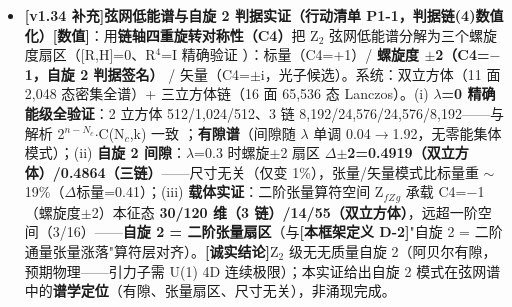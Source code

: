 \documentclass[12pt]{article}
\newcommand{\mtag}[1]{\textbf{[#1]}}
\newcommand{\up}[1]{\ensuremath{^{#1}}}
\newcommand{\down}[1]{\ensuremath{_{#1}}}
\begin{document}
\begin{itemize}
\item \textbf{\mtag{v1.34 补充}弦网低能谱与自旋 2 判据实证（行动清单 P1-1，判据链(4)数值化）}\mtag{数值}：用\textbf{链轴四重旋转对称性（C4）}把 Z\down{2} 弦网低能谱分解为三个螺旋度扇区（[R,H]=0、R\up{4}=I 精确验证 \checkmark）：标量（C4=+1）/ \textbf{螺旋度 \ensuremath{\pm}2（C4=\ensuremath{-}1，自旋 2 判据签名）} / 矢量（C4=\ensuremath{\pm}i，光子候选）。系统：双立方体（11 面 2,048 态密集全谱）+ 三立方体链（16 面 65,536 态 Lanczos）。(i) \textbf{\ensuremath{\lambda}=0 精确能级全验证}：2 立方体 512/1,024/512、3 链 8,192/24,576/24,576/8,192------与解析 2\up{n-N\down{c}}\ensuremath{\cdot}C(N\down{c},k) 一致 \checkmark；\textbf{有隙谱}（间隙随 \ensuremath{\lambda} 单调 0.04\ensuremath{\to}1.92，无零能集体模式）；(ii) \textbf{自旋 2 间隙}：\ensuremath{\lambda}=0.3 时螺旋\ensuremath{\pm}2 扇区 \textbf{\ensuremath{\Delta}\ensuremath{\pm}2=0.4919（双立方体）/0.4864（三链）}------尺寸无关（仅变 1\%），张量/矢量模式比标量重 \ensuremath{\sim}19\%（\ensuremath{\Delta}标量=0.41）；(iii) \textbf{载体实证}：二阶张量算符空间 Z\down{fZ}\down{g} 承载 C4=\ensuremath{-}1（螺旋度\ensuremath{\pm}2）本征态 \textbf{30/120 维（3 链）/14/55（双立方体）}，远超一阶空间（3/16）------\textbf{自旋 2 = 二阶张量扇区}（与\mtag{本框架定义 D-2}"自旋 2 = 二阶通量张量涨落"算符层对齐）。\mtag{诚实结论}Z\down{2} 级无无质量自旋 2（阿贝尔有隙，预期物理------引力子需 U(1) 4D 连续极限）；本实证给出自旋 2 模式在弦网谱中的\textbf{谱学定位}（有隙、张量扇区、尺寸无关），非涌现完成。
\end{itemize}
\end{document}
